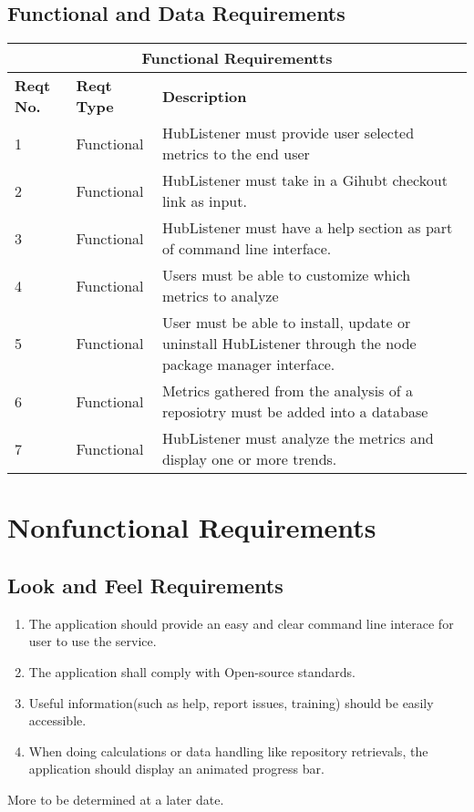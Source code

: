 \documentclass{article}
\begin{document}
\subsection{Functional and Data Requirements }
\begin{tabular}{ |p{1cm}|p{3cm}|p{5cm}| }
 \hline
 \multicolumn{3}{|c|}{\textbf{Functional Requirementts}} \\
 \hline
\textbf{Reqt No.} & \textbf{Reqt Type} & \textbf{Description} \\
\hline 
1 & Functional  & HubListener must provide user selected metrics to the end user\\
\hline 
2 & Functional  &  HubListener must take in a Gihubt checkout link as input. \\
\hline 
3 & Functional  & HubListener must have a help section as part of command line interface.\\ 
 \hline 
4 & Functional  & Users must be able to customize which metrics to analyze \\
 \hline 
5 & Functional  & User must be able to install, update or uninstall HubListener through the node package manager interface.\\
 \hline 
6 & Functional  &  Metrics gathered from the analysis of a reposiotry must  be added into a database \\
 \hline 
7 & Functional & HubListener must analyze the metrics and display one or more trends. \\
\hline
\end{tabular}


\newpage
\section{Nonfunctional Requirements}

\subsection{Look and Feel Requirements}
\begin{enumerate}
\item The application should provide an easy and clear command line interace for user to use the service.
\item The application shall comply with Open-source standards.
\item Useful information(such as help, report issues, training) should be easily accessible.
\item When doing calculations or data handling like repository retrievals, the application should display an animated progress bar. 
\end{enumerate}
More to be determined at a later date.
\end{document}
